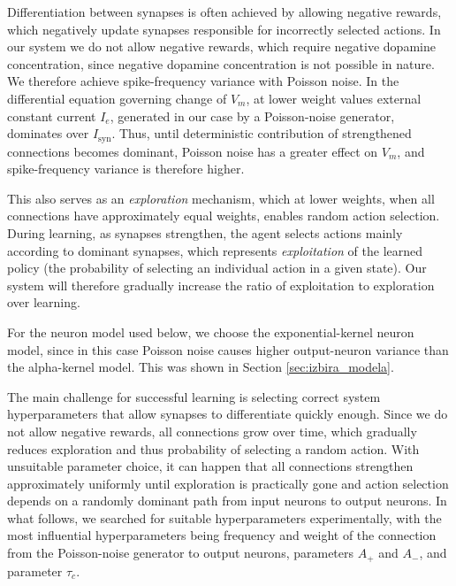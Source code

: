 \documentclass[a4paper,12pt,openright]{book}
\begin{document}
Differentiation between synapses is often achieved by allowing negative rewards, which negatively update synapses responsible for incorrectly selected actions. In our system we do not allow negative rewards, which require negative dopamine concentration, since negative dopamine concentration is not possible in nature. We therefore achieve spike-frequency variance with Poisson noise. In the differential equation governing change of $V_m$, at lower weight values external constant current $I_e$, generated in our case by a Poisson-noise generator, dominates over $I_{\text{syn}}$. Thus, until deterministic contribution of strengthened connections becomes dominant, Poisson noise has a greater effect on $V_m$, and spike-frequency variance is therefore higher.

This also serves as an \textit{exploration} mechanism, which at lower weights, when all connections have approximately equal weights, enables random action selection. During learning, as synapses strengthen, the agent selects actions mainly according to dominant synapses, which represents \textit{exploitation} of the learned policy (the probability of selecting an individual action in a given state). Our system will therefore gradually increase the ratio of exploitation to exploration over learning.

For the neuron model used below, we choose the exponential-kernel neuron model, since in this case Poisson noise causes higher output-neuron variance than the alpha-kernel model. This was shown in Section \ref{sec:izbira_modela}.

The main challenge for successful learning is selecting correct system hyperparameters that allow synapses to differentiate quickly enough. Since we do not allow negative rewards, all connections grow over time, which gradually reduces exploration and thus probability of selecting a random action. With unsuitable parameter choice, it can happen that all connections strengthen approximately uniformly until exploration is practically gone and action selection depends on a randomly dominant path from input neurons to output neurons. In what follows, we searched for suitable hyperparameters experimentally, with the most influential hyperparameters being frequency and weight of the connection from the Poisson-noise generator to output neurons, parameters $A_+$ and $A_-$, and parameter $\tau_c$.
\end{document}

